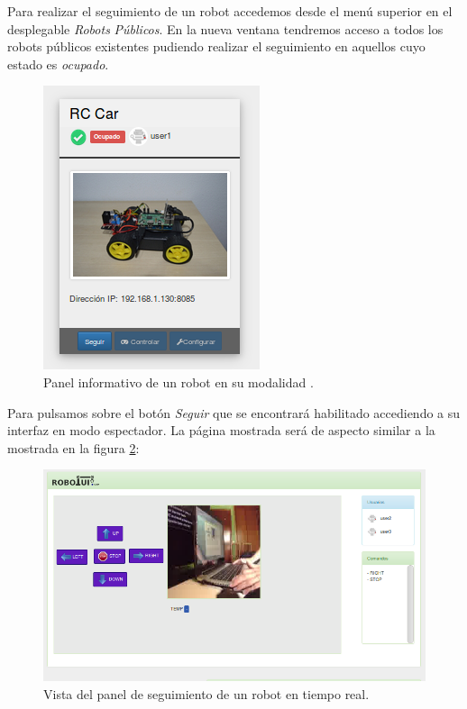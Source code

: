 Para realizar el seguimiento de un robot accedemos desde el menú superior en el desplegable \emph{Robots} \textrightarrow \enspace \emph{Públicos}. En la nueva ventana
tendremos acceso a todos los robots públicos existentes pudiendo realizar el seguimiento en aquellos cuyo estado es \emph{ocupado}.

\begin{figure}[H]
  \begin{center}
    \includegraphics[scale=.6]{imagenes/manual-usuario/tarjeta_ocupado.png}
  \end{center}
  \caption{ Panel informativo de un robot en su modalidad .}
  \label{website:robot-ocupado}
\end{figure}

Para pulsamos sobre el botón \emph{Seguir} que se encontrará habilitado accediendo a su interfaz en modo espectador. La página mostrada será de aspecto similar a la mostrada en la figura \ref{website:ventana-seguimiento}:\\

\begin{figure}[H]
  \begin{center}
    \includegraphics[scale=.6]{imagenes/manual-usuario/vista_seguimiento.png}
  \end{center}
  \caption{ Vista del panel de seguimiento de un robot en tiempo real.}
  \label{website:ventana-seguimiento}
\end{figure}

